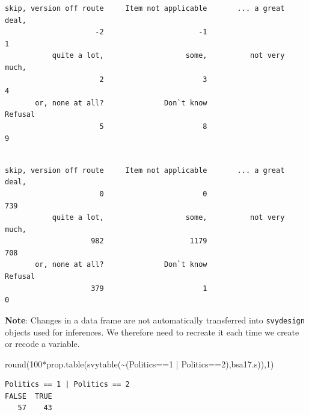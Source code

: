 \documentclass[
  14,
  a4paper,
  DIV=11,
  numbers=noendperiod]{scrartcl}
\newenvironment{Shaded}{\begin{snugshade}}{\end{snugshade}}
\newcommand{\DecValTok}[1]{\textcolor[rgb]{0.68,0.00,0.00}{#1}}
\newcommand{\DocumentationTok}[1]{\textcolor[rgb]{0.37,0.37,0.37}{\textit{#1}}}
\newcommand{\FunctionTok}[1]{\textcolor[rgb]{0.28,0.35,0.67}{#1}}
\newcommand{\NormalTok}[1]{\textcolor[rgb]{0.00,0.23,0.31}{#1}}
\newcommand{\SpecialCharTok}[1]{\textcolor[rgb]{0.37,0.37,0.37}{#1}}
\begin{document}
\begin{verbatim}
skip, version off route     Item not applicable       ... a great deal, 
                     -2                      -1                       1 
           quite a lot,                   some,          not very much, 
                      2                       3                       4 
       or, none at all?              Don`t know                 Refusal 
                      5                       8                       9 
\end{verbatim}

\begin{Shaded}
\end{Shaded}

\begin{verbatim}

skip, version off route     Item not applicable       ... a great deal, 
                      0                       0                     739 
           quite a lot,                   some,          not very much, 
                    982                    1179                     708 
       or, none at all?              Don`t know                 Refusal 
                    379                       1                       0 
\end{verbatim}

\textbf{Note}: Changes in a data frame are not automatically transferred
into \texttt{svydesign} objects used for inferences. We therefore need
to recreate it each time we create or recode a variable.

\begin{Shaded}
\begin{Highlighting}[]
\FunctionTok{round}\NormalTok{(}\DecValTok{100}\SpecialCharTok{*}\FunctionTok{prop.table}\NormalTok{(}\FunctionTok{svytable}\NormalTok{(}\SpecialCharTok{\textasciitilde{}}\NormalTok{(Politics}\SpecialCharTok{==}\DecValTok{1} \SpecialCharTok{|}\NormalTok{ Politics}\SpecialCharTok{==}\DecValTok{2}\NormalTok{),bsa17.s)),}\DecValTok{1}\NormalTok{)}
\end{Highlighting}
\end{Shaded}

\begin{verbatim}
Politics == 1 | Politics == 2
FALSE  TRUE 
   57    43 
\end{verbatim}
\end{document}
